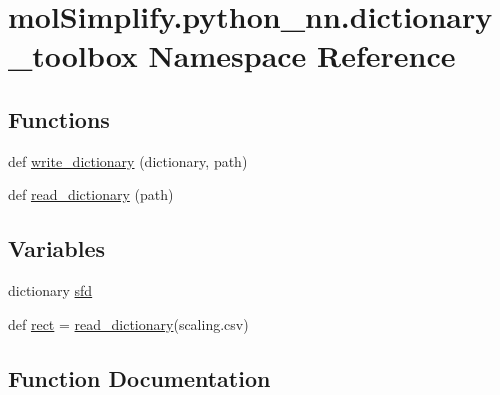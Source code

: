 \hypertarget{namespacemolSimplify_1_1python__nn_1_1dictionary__toolbox}{}\section{mol\+Simplify.\+python\+\_\+nn.\+dictionary\+\_\+toolbox Namespace Reference}
\label{namespacemolSimplify_1_1python__nn_1_1dictionary__toolbox}
\subsection*{Functions}
\begin{DoxyCompactItemize}
\item 
def \hyperlink{namespacemolSimplify_1_1python__nn_1_1dictionary__toolbox_ade3b979e151ffe9a92f8b2177b03684d}{write\+\_\+dictionary} (dictionary, path)
\item 
def \hyperlink{namespacemolSimplify_1_1python__nn_1_1dictionary__toolbox_afaef56327c98b2f550f32f21f1965d45}{read\+\_\+dictionary} (path)
\end{DoxyCompactItemize}
\subsection*{Variables}
\begin{DoxyCompactItemize}
\item 
dictionary \hyperlink{namespacemolSimplify_1_1python__nn_1_1dictionary__toolbox_a20e80ba08ede10a2c9d194a313a664bd}{sfd}
\item 
def \hyperlink{namespacemolSimplify_1_1python__nn_1_1dictionary__toolbox_ab5e0d6f880a548c3aedae513a9202ae7}{rect} = \hyperlink{namespacemolSimplify_1_1python__nn_1_1dictionary__toolbox_afaef56327c98b2f550f32f21f1965d45}{read\+\_\+dictionary}(\textquotesingle{}scaling.\+csv\textquotesingle{})
\end{DoxyCompactItemize}


\subsection{Function Documentation}
\mbox{\label{namespacemolSimplify_1_1python__nn_1_1dictionary__toolbox_afaef56327c98b2f550f32f21f1965d45}} 

